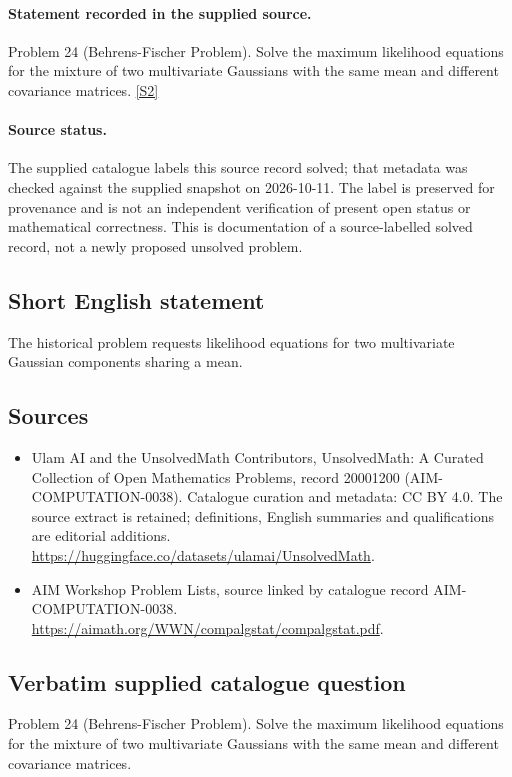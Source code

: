 \documentclass[11pt]{article}
\begin{document}
\paragraph{Statement recorded in the supplied source.}
Problem 24 (Behrens-Fischer Problem). Solve the maximum likelihood equations for the mixture of two multivariate Gaussians with the same mean and different covariance matrices. \href{https://aimath.org/WWN/compalgstat/compalgstat.pdf}{[S2]}
\paragraph{Source status.}
The supplied catalogue labels this source record solved; that metadata was checked against the supplied snapshot on 2026-10-11. The label is preserved for provenance and is not an independent verification of present open status or mathematical correctness. This is documentation of a source-labelled solved record, not a newly proposed unsolved problem.
\subsection{Short English statement}
The historical problem requests likelihood equations for two multivariate Gaussian components sharing a mean.
\subsection{Sources}
\begin{itemize}
\item[S1] Ulam AI and the UnsolvedMath Contributors, UnsolvedMath: A Curated Collection of Open Mathematics Problems, record 20001200 (AIM-COMPUTATION-0038). Catalogue curation and metadata: CC BY 4.0. The source extract is retained; definitions, English summaries and qualifications are editorial additions.
\url{https://huggingface.co/datasets/ulamai/UnsolvedMath}.
\item[S2] AIM Workshop Problem Lists, source linked by catalogue record AIM-COMPUTATION-0038.
\url{https://aimath.org/WWN/compalgstat/compalgstat.pdf}.
\end{itemize}
\subsection{Verbatim supplied catalogue question}
Problem 24 (Behrens-Fischer Problem). Solve the maximum likelihood equations for the mixture of two multivariate Gaussians with the same mean and different covariance matrices.
\end{document}
